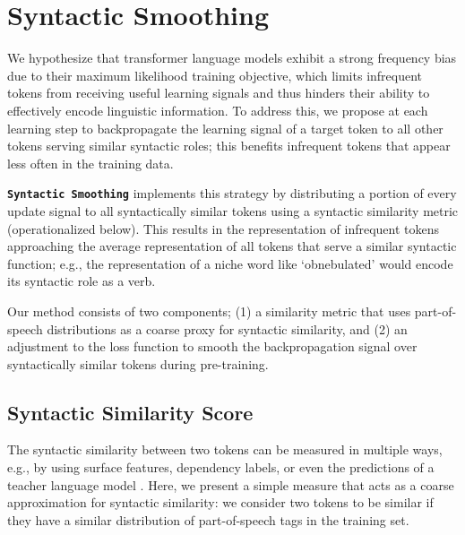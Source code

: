 \section{Syntactic Smoothing}
\label{sec:smoothing-method}

We hypothesize that transformer language models exhibit a strong frequency bias due to their maximum likelihood training objective, which limits infrequent tokens from receiving useful learning signals and thus hinders their ability to effectively encode linguistic information. To address this, we propose at each learning step to backpropagate the learning signal of a target token to all other tokens serving similar syntactic roles; this benefits infrequent tokens that appear less often in the training data.

\textbf{\texttt{Syntactic Smoothing}} implements this strategy by distributing a portion of every update signal to all syntactically similar tokens using a syntactic similarity metric (operationalized below). This results in the representation of infrequent tokens approaching the average representation of all tokens that serve a similar syntactic function; e.g., the representation of a niche word like `obnebulated' would encode its syntactic role as a verb.

Our method consists of two components; (1) a similarity metric that uses part-of-speech distributions as a coarse proxy for syntactic similarity, and (2) an adjustment to the loss function to smooth the backpropagation signal over syntactically similar tokens during pre-training. 

\subsection{Syntactic Similarity Score}\label{sec:sim}

The syntactic similarity between two tokens can be measured in multiple ways, e.g., by using surface features, dependency labels, or even the predictions of a teacher language model \citep{hinton2015distilling}. Here, we present a simple measure that acts as a coarse approximation for syntactic similarity: we consider two tokens to be similar if they have a similar distribution of part-of-speech tags in the training set.


